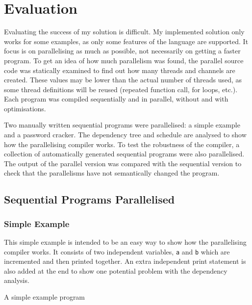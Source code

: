 \chapter{Evaluation}
\label{sec:evaluation}
Evaluating the success of my solution is difficult. My implemented solution only works for some examples, as only some features of the language are supported. It focus is on parallelising as much as possible, not necessarily on getting a faster program. To get an idea of how much parallelism was found, the parallel source code was statically examined to find out how many threads and channels are created. These values may be lower than the actual number of threads used, as some thread definitions will be reused (repeated function call, for loops, etc.). Each program was compiled sequentially and in parallel, without and with optimisations.

Two manually written sequential programs were parallelised: a simple example and a password cracker. The dependency tree and schedule are analysed to show how the parallelising compiler works. To test the robustness of the compiler, a collection of automatically generated sequential programs were also parallelised. The output of the parallel version was compared with the sequential version to check that the parallelisms have not semantically changed the program.

\section{Sequential Programs Parallelised}
\subsection{Simple Example}
This simple example is intended to be an easy way to show how the parallelising compiler works. It consists of two independent variables, \texttt{a} and \texttt{b} which are incremented and then printed together. An extra independent print statement is also added at the end to show one potential problem with the dependency analysis.

\begin{code}
    \caption{A simple example program}
\end{code}

